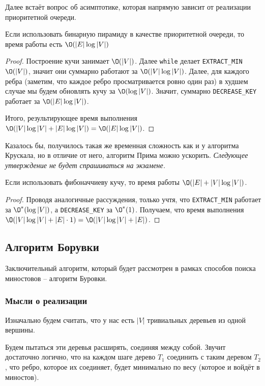 Далее встаёт вопрос об асимптотике, которая напрямую зависит от реализации приоритетной очереди.

\St Если использовать бинарную пирамиду в качестве приоритетной очереди, то время работы есть $\O(|E| \log |V|)$
\begin{proof}
    
    Построение кучи занимает $\O(|V|)$. Далее \texttt{while} делает \texttt{EXTRACT\_MIN} $\O(|V|)$, значит они суммарно работают за $\O(|V| \log |V|)$.
    Далее, для каждого ребра (заметим, что каждое ребро просматривается ровно один раз) в худшем случае мы будем обновлять кучу за $\O(\log |V|)$.
    Значит, суммарно \texttt{DECREASE\_KEY} работает за $\O(|E| \log |V|)$.

    Итого, результирующее время выполнения $\O(|V| \log |V| + |E| \log |V|) = \O(|E| \log |V|)$.
    
\end{proof}

Казалось бы, получилось такая же временная сложность как и у алгоритма Крускала, но в отличие от него, алгоритм Прима можно ускорить. \textit{Следующее утверждение не будет спрашиваться на экзамене.}

\StBd Если использовать фибоначчиеву кучу, то время работы $\O(|E| + |V| \log |V|)$.

\begin{proof}

    Проводя аналогичные рассуждения, только учтя, что \texttt{EXTRACT\_MIN} работает за $\O^*(\log |V|)$, а \texttt{DECREASE\_KEY} за $\O^*(1)$.
    Получаем, что время выполнения $\O(|V| \log |V| + |E| \cdot 1) = \O(|V| \log |V| + |E|)$.

\end{proof}

\subsection{Алгоритм Борувки}

Заключительный алгоритм, который будет рассмотрен в рамках способов поиска миностовов -- алгоритм Буровки.

\subsubsection{Мысли о реализации}

Изначально будем считать, что у нас есть $|V|$ тривиальных деревьев из одной вершины.

Будем пытаться эти деревья расширять, соединяя между собой. 
Звучит достаточно логично, что на каждом шаге дерево $T_1$ соединить с таким деревом $T_2$, что ребро, которое их соединяет, будет минимально по весу (которое и войдёт в миностов).

